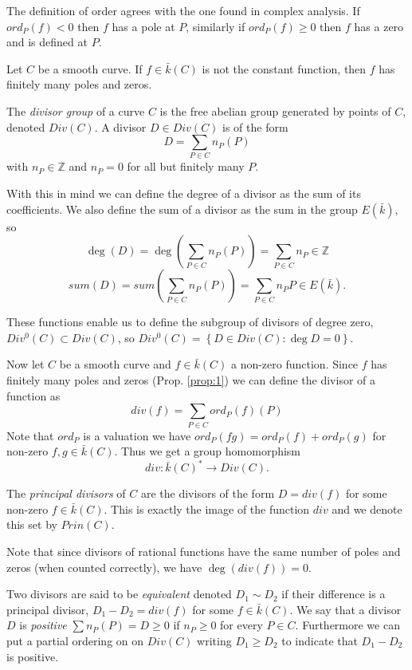 The definition of order agrees with the one found in complex analysis.
If $ord_P(f) < 0$ then $f$ has a pole at $P$, similarly if $ord_P(f) \ge 0$ then $f$ 
has a zero and is defined at $P$.

\begin{prop}
 Let $C$ be a smooth curve. If $f\in \bar{k}(C)$ is not the constant function, then
$f$ has finitely many poles and zeros.
\label{prop:1}
\end{prop}

\begin{mydef}
 The \emph{divisor group} of a curve $C$ is the free abelian group generated by
points of $C$, denoted $Div(C)$. A divisor $D\in Div(C)$ is of the form
$$ D = \sum_{P\in C} n_P(P)$$
with $n_P\in\mathbb{Z}$ and $n_P = 0$ for all but finitely many $P$.
\end{mydef}

With this in mind we can define the degree of a divisor as the sum of its 
coefficients. We also define the sum of a divisor as the sum in the group $E(\bar{k})$, so
$$ \deg(D) = \deg\left(\sum_{P\in C} n_P(P)\right) = \sum_{P\in C} n_P \in \mathbb{Z}$$
$$ sum(D) = sum\left(\sum_{P\in C} n_P(P)\right) = \sum_{P\in C} n_P P \in E(\bar{k}).$$

These functions enable us to define the subgroup of divisors of degree zero,
$Div^0(C) \subset Div(C)$, so $Div^0(C) = \left\{ D\in Div(C) : \deg D  = 0 \right\}.$

Now let $C$ be a smooth curve and $f\in \bar{k}(C)$ a non-zero function. Since $f$
has finitely many poles and zeros (Prop. \ref{prop:1}) we can define the divisor of a
function as
$$ div(f) = \sum_{P\in C} ord_P(f)(P) $$
Note that $ord_P$ is a valuation we have $ord_P(fg) = ord_P(f)+ord_P(g)$
for non-zero $f,g\in \bar{k}(C)$. Thus we get a group homomorphism
$$ div: \bar{k}(C)^* \rightarrow Div(C).$$

\begin{mydef}
 The \emph{principal divisors} of $C$ are the divisors of the form
$ D = div(f) $ for some non-zero $f\in \bar{k}(C)$. This is exactly
the image of the function $div$ and we denote this set by $Prin(C)$.
\end{mydef}

Note that since divisors of rational functions have the same number of poles
and zeros (when counted correctly), we have $\deg(div(f)) = 0$.

Two divisors are said to be \emph{equivalent} denoted $D_1 \sim D_2$ if
their difference is a principal divisor, $D_1 - D_2 = div(f)$ for some $f\in \bar{k}(C)$.
We say that a divisor $D$ is
\emph{positive} $\sum n_P(P)=D \geq 0$ if $n_P \geq 0$ for every $P\in C$. Furthermore
we can put a partial ordering on on $Div(C)$ writing $D_1 \geq D_2$ to indicate that $D_1 - D_2$ is positive.

